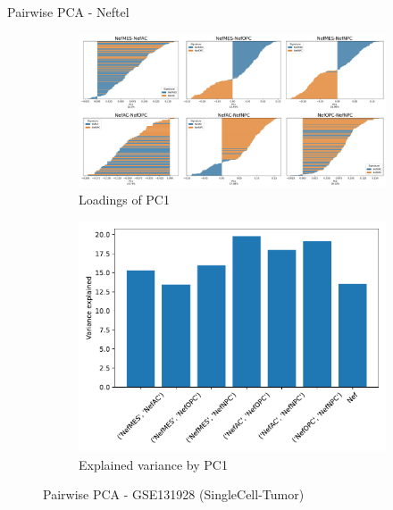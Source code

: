 \documentclass[aspectratio=169,9pt]{beamer}
\begin{document}
    \begin{frame}{Pairwise PCA - Neftel}
        \begin{adjustwidth}{-5cm}{-5cm}
            \centering
            \begin{figure}
                \centering
                \begin{subfigure}[c]{0.7\textwidth}
                    \centering
                    \includegraphics[width=\textwidth]{GSM3828672_loadings_barplot_pair-Nef}
                    \caption{Loadings of PC1}
                \end{subfigure}
                \begin{subfigure}[c]{0.4\textwidth}
                    \centering
                    \includegraphics[width=\textwidth]{GSM3828672_expvar_Nef}
                    \caption{Explained variance by PC1}
                \end{subfigure}
                \caption{Pairwise PCA - GSE131928 (SingleCell-Tumor)}
            \end{figure}
        \end{adjustwidth}
    \end{frame}
\end{document}
